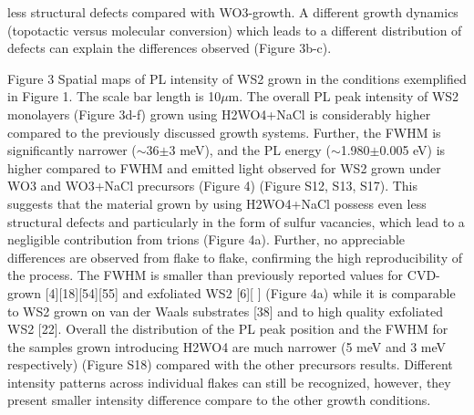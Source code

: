 \documentclass[12pt]{article}
\begin{document}
less structural defects compared with WO3-growth. A different growth dynamics (topotactic versus molecular conversion) which leads to a different distribution of defects can explain the differences observed (Figure 3b-c). 
 
Figure 3 Spatial maps of PL intensity of WS2 grown in the conditions exemplified in Figure 1. The scale bar length is 10$\mu$m.
The overall PL peak intensity of WS2 monolayers (Figure 3d-f) grown using H2WO4+NaCl is considerably higher compared to the previously discussed growth systems. Further, the FWHM is significantly narrower ({$\sim$}36{$\pm$}3 meV), and the PL energy ({$\sim$}1.980{$\pm$}0.005 eV) is higher compared to FWHM and emitted light observed for WS2 grown under WO3 and WO3+NaCl precursors (Figure 4) (Figure S12, S13, S17). This suggests that the material grown by using H2WO4+NaCl possess even less structural defects and particularly in the form of sulfur vacancies, which lead to a negligible contribution from trions (Figure 4a). Further, no appreciable differences are observed from flake to flake, confirming the high reproducibility of the process. The FWHM is smaller than previously reported values for CVD-grown [4][18][54][55] and exfoliated WS2 [6][ ] (Figure 4a) while it is comparable to WS2 grown on van der Waals substrates [38] and to high quality exfoliated WS2 [22]. Overall the distribution of the PL peak position and the FWHM for the samples grown introducing H2WO4 are much narrower (5 meV and 3 meV respectively) (Figure S18) compared with the other precursors results. Different intensity patterns across individual flakes can still be recognized, however, they present smaller intensity difference compare to the other growth conditions. 
 
\end{document}
